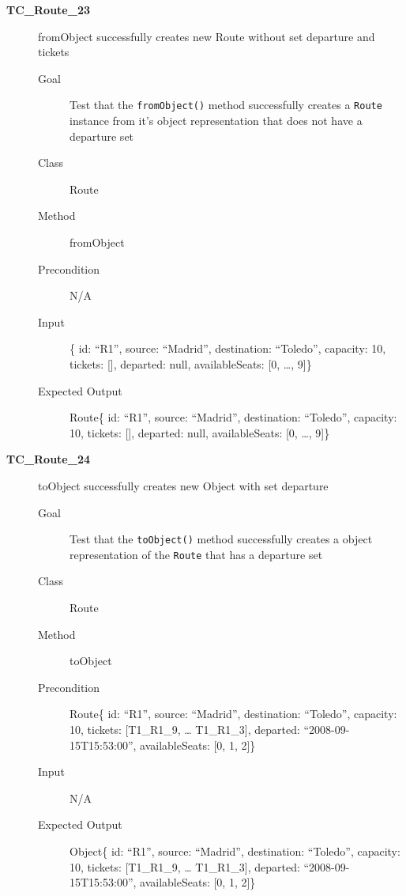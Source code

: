 \documentclass[11pt]{article}
\begin{document}
\begin{description}
\item[{\textbf{TC\_Route\_23}}] fromObject successfully creates new Route without set departure and tickets
\begin{description}
\item[{Goal}] Test that the \texttt{fromObject()} method successfully creates a \texttt{Route} instance from it's object representation that does not have a departure set
\item[{Class}] Route
\item[{Method}] fromObject
\item[{Precondition}] N/A
\item[{Input}] \{ id: “R1”, source: “Madrid”, destination: “Toledo”, capacity: 10,  tickets: [], departed: null, availableSeats: [0, …, 9]\}
\item[{Expected Output}] Route\{ id: “R1”, source: “Madrid”, destination: “Toledo”, capacity: 10,  tickets: [], departed: null, availableSeats: [0, …, 9]\}
\end{description}

\item[{\textbf{TC\_Route\_24}}] toObject successfully creates new Object with set departure
\begin{description}
\item[{Goal}] Test that the \texttt{toObject()} method successfully creates a object representation of the \texttt{Route} that has a departure set
\item[{Class}] Route
\item[{Method}] toObject
\item[{Precondition}] Route\{ id: “R1”, source: “Madrid”, destination: “Toledo”, capacity: 10,  tickets: [T1\_R1\_9, … T1\_R1\_3], departed: “2008-09-15T15:53:00”, availableSeats: [0, 1, 2]\}
\item[{Input}] N/A
\item[{Expected Output}] Object\{ id: “R1”, source: “Madrid”, destination: “Toledo”, capacity: 10,  tickets: [T1\_R1\_9, … T1\_R1\_3], departed: “2008-09-15T15:53:00”, availableSeats: [0, 1, 2]\}
\end{description}


\end{description}
\end{document}
